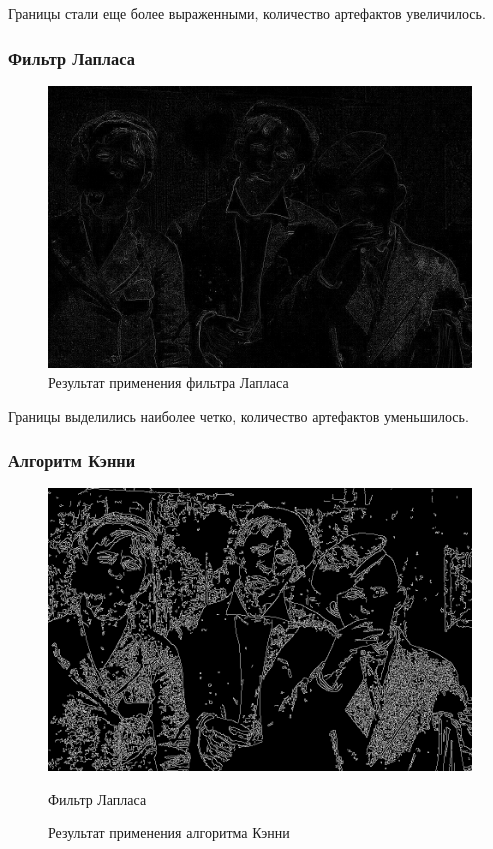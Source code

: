 Границы стали еще более выраженными, количество артефактов увеличилось. 

\subsubsection{Фильтр Лапласа}

\begin{figure}[ht!]
  \centering
  \includegraphics[width=\textwidth]{../Edge_Detection/Laplassian_Smoking_boys.jpg}
  \caption{Результат применения фильтра Лапласа}
  \label{img:laplassian}  
\end{figure}
\FloatBarrier

Границы выделились наиболее четко, количество артефактов уменьшилось.

\subsubsection{Алгоритм Кэнни}
\begin{figure}[ht!]
  \centering
  \includegraphics[width=\textwidth]{../Edge_Detection/Canny_Smoking_boys.jpg}
  \caption{Фильтр Лапласа}
  \caption{Результат применения алгоритма Кэнни}
  \label{img:canny}  
\end{figure}
\FloatBarrier

